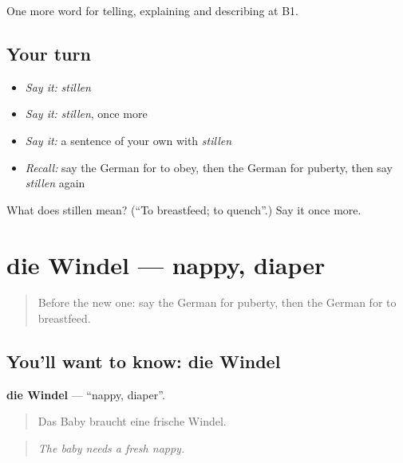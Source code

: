 \begin{grammarlens}[title={What you've built}]
One more word for telling, explaining and describing at B1.
\end{grammarlens}

\subsection*{Your turn}
\begin{itemize}
\raggedright
  \item \emph{Say it:} \emph{stillen}
  \item \emph{Say it:} \emph{stillen}, once more
  \item \emph{Say it:} a sentence of your own with \emph{stillen}
  \item \emph{Recall:} say the German for to obey, then the German for puberty, then say \emph{stillen} again
\end{itemize}

\begin{tcolorbox}[breakable,colback=teal!4,colframe=teal!35!black,title={Before you move on}]
What does stillen mean? (\textquotedblleft{}To breastfeed; to quench\textquotedblright{}.) Say it once more.
\end{tcolorbox}
\section[die Windel]{die Windel — nappy, diaper}

\label{lesson:GE-C496-windel}



\begin{quote}
Before the new one: say the German for puberty, then the German for to breastfeed.
\end{quote}

\subsection*{You'll want to know: die Windel}
\textbf{die Windel} — \textquotedblleft{}nappy, diaper\textquotedblright{}.

\begin{quote}
Das Baby braucht eine frische Windel.
\end{quote}

\begin{quote}
\emph{The baby needs a fresh nappy.}
\end{quote}

